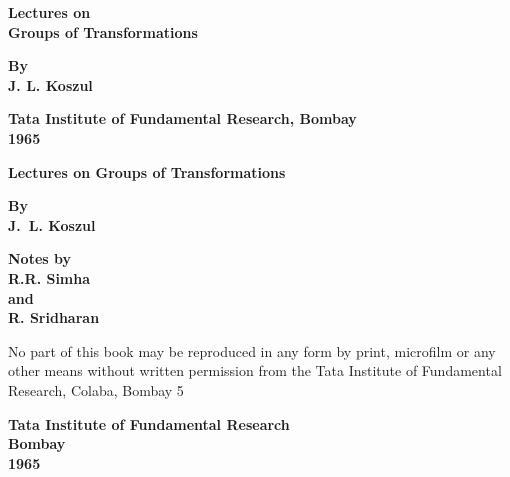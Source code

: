 \thispagestyle{empty}

\begin{center}

{\Large\bf Lectures on}\\[5pt]
{\Large\bf Groups of Transformations}
\vskip 1cm

{\bf By}\\[5pt]
{\large\bf J. L. Koszul}
\vfill


{\bf Tata Institute of Fundamental Research, Bombay}\\[5pt]
{\bf 1965}
\end{center}
\eject


\thispagestyle{empty}

\begin{center}
{\Large\bf Lectures on Groups of Transformations}\\
\vskip 1cm

{\bf By}\\[5pt]
{\large\bf J.~L. Koszul}\\
\vfill

{\bf Notes by}\\[5pt]
{\large\bf R.R. Simha}\\[5pt]
{\large\bf and}\\[5pt]
{\large\bf R. Sridharan}\\
\vfill

\parbox{0.7\textwidth}{No part of this book may be reproduced
in any form by print, microfilm or any
other means without written permission
from the Tata Institute of Fundamental
Research, Colaba, Bombay 5}
\vfill


{\bf Tata Institute of Fundamental Research}\\[5pt]
{\bf Bombay}\\[5pt]
{\bf 1965}
\end{center}

